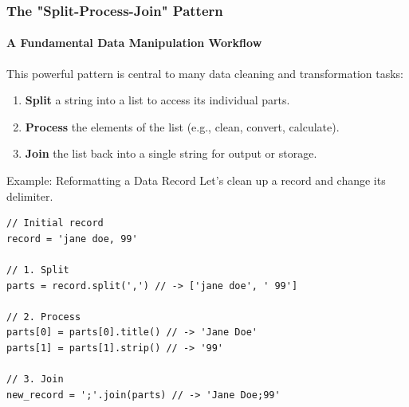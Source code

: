 \documentclass{beamer}
\begin{document}
\begin{frame}[fragile]
    \frametitle{The "Split-Process-Join" Pattern}
    \framesubtitle{A Fundamental Data Manipulation Workflow}

    This powerful pattern is central to many data cleaning and transformation tasks:
    \begin{enumerate}
        \item \textbf{Split} a string into a list to access its individual parts.
        \item \textbf{Process} the elements of the list (e.g., clean, convert, calculate).
        \item \textbf{Join} the list back into a single string for output or storage.
    \end{enumerate}

    \vspace{1em}

    \begin{block}{Example: Reformatting a Data Record}
        Let's clean up a record and change its delimiter.
        \begin{verbatim}
// Initial record
record = 'jane doe, 99'

// 1. Split
parts = record.split(',') // -> ['jane doe', ' 99']

// 2. Process
parts[0] = parts[0].title() // -> 'Jane Doe'
parts[1] = parts[1].strip() // -> '99'

// 3. Join
new_record = ';'.join(parts) // -> 'Jane Doe;99'
        \end{verbatim}
    \end{block}
\end{frame}
\end{document}

